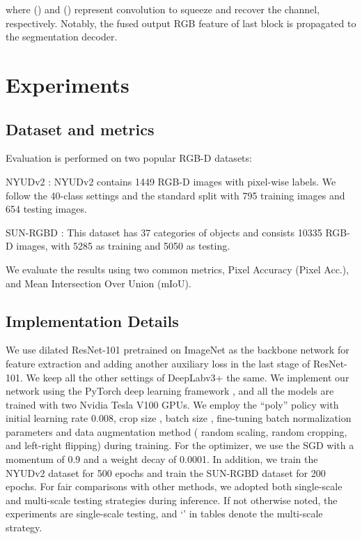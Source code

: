 \documentclass[10pt,twocolumn,letterpaper]{article}
\begin{document}
where  () and  () represent  convolution to squeeze and recover the channel, respectively.
Notably, the fused output RGB feature of last block is propagated to the segmentation decoder.











\section{Experiments}
\label{Experiment}

\subsection{Dataset and metrics}
Evaluation is performed on two popular RGB-D datasets:

NYUDv2 \cite{silberman2012indoor}: NYUDv2 contains 1449 RGB-D images with pixel-wise labels.
We follow the 40-class settings and the standard split with 795 training images and 654 testing images.

SUN-RGBD \cite{song2015sun}: This dataset has 37 categories of objects and consists 10335 RGB-D images, with 5285 as training
and 5050 as testing.

We evaluate the results using two common metrics,  Pixel Accuracy (Pixel Acc.), and Mean Intersection Over Union (mIoU).




\subsection{Implementation Details}
We use dilated ResNet-101\cite{he2016deep} pretrained on ImageNet\cite{russakovsky2015imagenet} as the backbone network for
feature extraction and adding another auxiliary loss in the last stage of ResNet-101. We keep all the other settings of
DeepLabv3+ \cite{chen2018encoder} the same.
We implement our network using the PyTorch deep learning framework \cite{paszke2019pytorch}, and all the models are trained
with two Nvidia Tesla V100 GPUs. We employ the ``poly” policy \cite{liu2015parsenet} with initial learning rate 0.008, crop
size , batch size , fine-tuning batch normalization parameters \cite{ioffe2015batch} and data augmentation
method ( random scaling, random cropping, and left-right flipping) during training. For the optimizer, we use the
SGD with a momentum of 0.9 and a weight decay of 0.0001. In addition, we train the NYUDv2 dataset for 500 epochs and train
the SUN-RGBD dataset for 200 epochs. For fair comparisons with other methods, we adopted both single-scale and multi-scale
testing strategies during inference. If not otherwise noted, the experiments are single-scale testing, and `' in tables
denote the multi-scale strategy.
\end{document}

